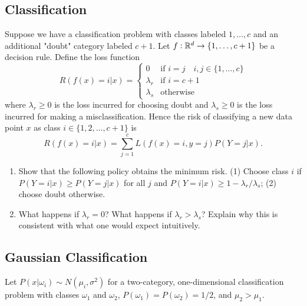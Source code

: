 \subsection{Classification}
Suppose we have a classification problem with classes labeled $1, \ldots, c$ and an additional "doubt" category labeled $c+1$. Let $f: \mathbb{R}^d \rightarrow \{1, \ldots, c+1\}$ be a decision rule. Define the loss function
$$ R(f(x) = i|x) =
\begin{cases}
0 & \text{if }i = j \quad i, j \in \{1, \ldots, c\} \\
\lambda_r & \text{if } i=c + 1 \\
\lambda_s & \text{otherwise}
\end{cases} $$
where $\lambda_r \geq 0$ is the loss incurred for choosing doubt and $\lambda_s \geq 0$ is the loss incurred for making a misclassification. Hence the risk of classifying a new data point $x$ as class $i \in \{1, 2, \ldots, c+1\}$ is $$R(f(x) = i|x) = \sum_{j=1}^c L(f(x) = i, y = j) P(Y = j|x).$$
\begin{enumerate}[label=(\alph*)]
    \item Show that the following policy obtains the minimum risk. (1) Choose class $i$ if $P(Y = i|x) \geq P(Y = j|x)$ for all $j$ and $P(Y=i|x) \geq 1 - \lambda_r / \lambda_s$; (2) choose doubt otherwise.
    \begin{mdframed}
    \solution %
    \end{mdframed}

    \item What happens if $\lambda_r = 0$? What happens if $\lambda_r > \lambda_s$?  Explain why this is consistent with what one would expect intuitively.
    \begin{mdframed}
    \solution %
    \end{mdframed}
\end{enumerate}

\newpage
\subsection{Gaussian Classification}
Let $P(x | \omega_i) \sim N(\mu_i, \sigma^2)$ for a two-category,
one-dimensional classification problem with classes $\omega_1$ and $\omega_2$,
$P(\omega_1) = P(\omega_2) = 1/2$, and $\mu_2 > \mu_1$.

